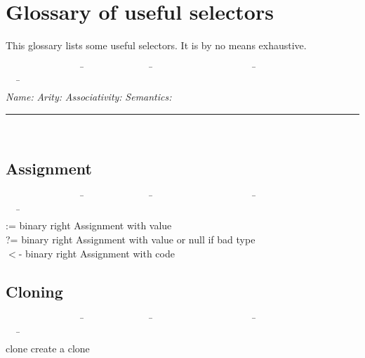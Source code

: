 \documentclass[11pt]{mybook}
\begin{document}
\section{Glossary of useful selectors}
\label{lisaac_world:glossary}
%
This glossary lists some useful selectors. 
It is by no means exhaustive.

\begin{tabbing}
~~~~~~~~~~~~~~~~\=~~~~~~~~~~~~~~\=~~~~~~~~~~~~~~~~~~~~~\=~~~~~~~~~~~~~~~~~~~~~~~~\=\kill\\
{\em Name:}     \> {\em Arity:} \> {\em Associativity:} \> {\em Semantics:}\\
\rule{16cm}{.04cm}        \>                                 \\
\end{tabbing}
\subsection{Assignment}
\label{lisaac_world:glossary:assignment}
%
\begin{tabbing}
~~~~~~~~~~~~~~~~\=~~~~~~~~~~~~~~\=~~~~~~~~~~~~~~~~~~~~~\=~~~~~~~~~~~~~~~~~~~~~~~~\=\kill\\
{:=}            \> binary \>right \> {Assignment with value} \\
{?=}            \> binary \>right \> {Assignment with value or {\sc{}null} if bad type} \\
{$<$-}          \> binary \>right \> {Assignment with code}  \\
\end{tabbing}
\subsection{Cloning}
\label{lisaac_world:glossary:clone}
\begin{tabbing}
~~~~~~~~~~~~~~~~\=~~~~~~~~~~~~~~\=~~~~~~~~~~~~~~~~~~~~~\=~~~~~~~~~~~~~~~~~~~~~~~~\=\kill\\
{clone}         \>        \>      \> {create a clone}        \\
\end{tabbing}
\end{document}

